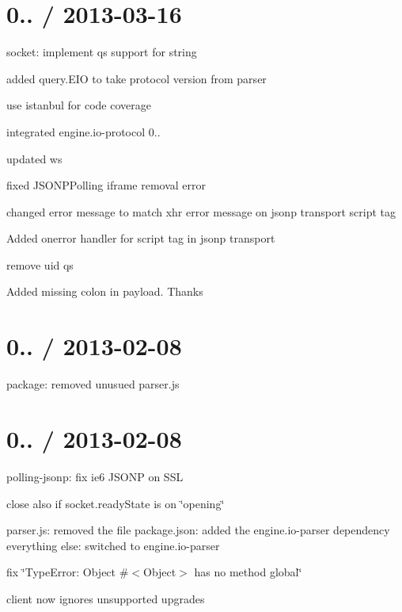 \section*{0.. / 2013-\/03-\/16 }


\begin{DoxyItemize}
\item socket\+: implement qs support for {\ttfamily string}
\item added query.\+E\+IO to take protocol version from parser
\item use istanbul for code coverage
\item integrated engine.\+io-\/protocol 0..
\item updated ws
\item fixed J\+S\+O\+N\+P\+Polling iframe removal error
\item changed error message to match xhr error message on jsonp transport script tag
\item Added onerror handler for script tag in jsonp transport
\item remove uid qs
\item Added missing colon in payload. Thanks 
\end{DoxyItemize}

\section*{0.. / 2013-\/02-\/08 }


\begin{DoxyItemize}
\item package\+: removed unusued {\ttfamily parser.\+js}
\end{DoxyItemize}

\section*{0.. / 2013-\/02-\/08 }


\begin{DoxyItemize}
\item polling-\/jsonp\+: fix ie6 J\+S\+O\+NP on S\+SL
\item close also if socket.\+ready\+State is on \char`\"{}opening\char`\"{}
\item parser.\+js\+: removed the file package.\+json\+: added the engine.\+io-\/parser dependency everything else\+: switched to engine.\+io-\/parser
\item fix \char`\"{}\+Type\+Error\+: Object \#$<$\+Object$>$ has no method \textquotesingle{}global\textquotesingle{}\char`\"{}
\item client now ignores unsupported upgrades
\end{DoxyItemize}


